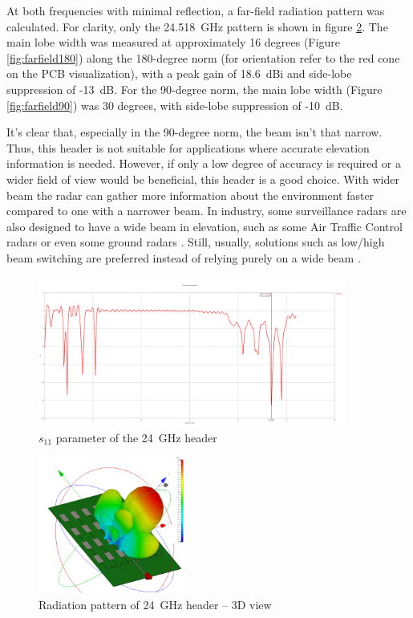 At both frequencies with minimal reflection, a far-field radiation pattern was calculated.
For clarity, only the 24.518~GHz pattern is shown in figure \ref{fig:farfield3d}.
The main lobe width was measured at approximately 16 degrees (Figure \ref{fig:farfield180}) along the 180-degree norm (for orientation refer to the red cone on the PCB visualization), with a peak gain of 18.6~dBi and side-lobe suppression of -13~dB.
For the 90-degree norm, the main lobe width (Figure \ref{fig:farfield90}) was 30 degrees, with side-lobe suppression of -10~dB.

It's clear that, especially in the 90-degree norm, the beam isn't that narrow.
Thus, this header is not suitable for applications where accurate elevation information is needed.
However, if only a low degree of accuracy is required or a wider field of view would be beneficial, this header is a good choice.
With wider beam  the radar can gather more information about the environment faster compared to one with a narrower beam.
In industry, some surveillance radars are also designed to have a wide beam in elevation, such as some Air Traffic Control radars \cite{kratos} or even some ground radars \cite{blighter}.
Still, usually, solutions such as low/high beam switching are preferred instead of relying purely on a wide beam \cite{wolfBeam}.

\begin{figure}[h!]
  \centering
  \includegraphics[width=0.9\textwidth]{../img/s11.png}
  \caption[$s_{11}$ parameter of the 24~GHz header]{$s_{11}$ parameter of the 24~GHz header}
  \label{fig:s11}
\end{figure}


\begin{figure}[h!]
  \centering
  \includegraphics[width=0.43\textwidth]{../img/farfield3d.png}
  \caption[Radiation pattern of 24~GHz header -- 3D view]{Radiation pattern of 24~GHz header -- 3D view}
  \label{fig:farfield3d}
\end{figure}

